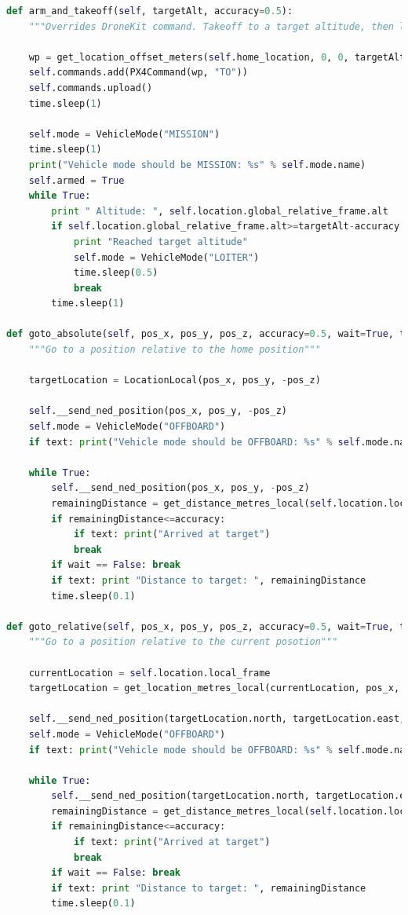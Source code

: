\documentclass[11pt]{article}
\begin{document}
\begin{lstlisting}[language=Python]
def arm_and_takeoff(self, targetAlt, accuracy=0.5):
    """Overrides DroneKit command. Takeoff to a target altitude, then loiter."""

    wp = get_location_offset_meters(self.home_location, 0, 0, targetAlt)
    self.commands.add(PX4Command(wp, "TO"))
    self.commands.upload()
    time.sleep(1)

    self.mode = VehicleMode("MISSION")
    time.sleep(1)
    print("Vehicle mode should be MISSION: %s" % self.mode.name)
    self.armed = True
    while True:
        print " Altitude: ", self.location.global_relative_frame.alt
        if self.location.global_relative_frame.alt>=targetAlt-accuracy:
            print "Reached target altitude"
            self.mode = VehicleMode("LOITER")
            time.sleep(0.5)
            break
        time.sleep(1)

def goto_absolute(self, pos_x, pos_y, pos_z, accuracy=0.5, wait=True, text=True):
    """Go to a position relative to the home position"""

    targetLocation = LocationLocal(pos_x, pos_y, -pos_z)

    self.__send_ned_position(pos_x, pos_y, -pos_z)
    self.mode = VehicleMode("OFFBOARD")
    if text: print("Vehicle mode should be OFFBOARD: %s" % self.mode.name)

    while True:
        self.__send_ned_position(pos_x, pos_y, -pos_z)
        remainingDistance = get_distance_metres_local(self.location.local_frame, targetLocation)
        if remainingDistance<=accuracy:
            if text: print("Arrived at target")
            break
        if wait == False: break
        if text: print "Distance to target: ", remainingDistance
        time.sleep(0.1)

def goto_relative(self, pos_x, pos_y, pos_z, accuracy=0.5, wait=True, text=True):
    """Go to a position relative to the current posotion"""

    currentLocation = self.location.local_frame
    targetLocation = get_location_metres_local(currentLocation, pos_x, pos_y, -pos_z)\

    self.__send_ned_position(targetLocation.north, targetLocation.east, targetLocation.down)
    self.mode = VehicleMode("OFFBOARD")
    if text: print("Vehicle mode should be OFFBOARD: %s" % self.mode.name)

    while True:
        self.__send_ned_position(targetLocation.north, targetLocation.east, targetLocation.down)
        remainingDistance = get_distance_metres_local(self.location.local_frame, targetLocation)
        if remainingDistance<=accuracy:
            if text: print("Arrived at target")
            break
        if wait == False: break
        if text: print "Distance to target: ", remainingDistance
        time.sleep(0.1)


\end{lstlisting}
\end{document}

